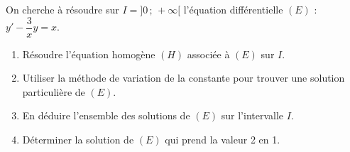 
\begin{exercice}\label{exostarterST-0025}


   On cherche à résoudre sur $I = ]0\,;\,+\infty[$ l'équation différentielle $(E)$ : $y'-\dfrac{3}{x}y=x$.
      \begin{enumerate}
      \item Résoudre l'équation homogène $(H)$ associée à $(E)$ sur $I$.
      \item Utiliser la méthode de variation de la constante pour trouver une solution particulière de $(E)$.
      \item En déduire l'ensemble des solutions de $(E)$ sur l'intervalle $I$.
      \item Déterminer la solution de $(E)$ qui prend la valeur 2 en 1.
      \end{enumerate}


\end{exercice}
